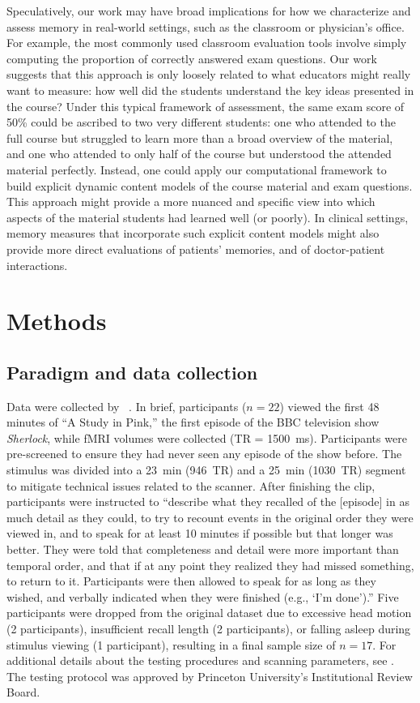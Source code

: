 \documentclass[10pt]{article}
\begin{document}
Speculatively, our work may have broad implications for how we characterize and assess memory in real-world settings, such as the classroom or physician's office.  For example, the most commonly used classroom evaluation tools involve simply computing the proportion of correctly answered exam questions.  Our work suggests that this approach is only loosely related to what educators might really want to measure: how well did the students understand the key ideas presented in the course?  Under this typical framework of assessment, the same exam score of 50\% could be ascribed to two very different students: one who attended to the full course but struggled to learn more than a broad overview of the material, and one who attended to only half of the course but understood the attended material perfectly.  Instead, one could apply our computational framework to build explicit dynamic content models of the course material and exam questions.  This approach might provide a more nuanced and specific view into which aspects of the material students had learned well (or poorly).  In clinical settings, memory measures that incorporate such explicit content models might also provide more direct evaluations of patients' memories, and of doctor-patient interactions.


\section*{Methods}
\label{sec:methods}

\subsection*{Paradigm and data collection}
Data were collected by \citeauthor{ChenEtal17}~\citep{ChenEtal17}.  In brief, participants ($n=22$) viewed the first 48 minutes of ``A Study in Pink,'' the first episode of the BBC television show \textit{Sherlock}, while fMRI volumes were collected (TR = 1500~ms).  Participants were pre-screened to ensure they had never seen any episode of the show before.  The stimulus was divided into a 23~min (946~TR) and a 25~min (1030~TR) segment to mitigate technical issues related to the scanner.  After finishing the clip, participants were instructed to \citep[quoting from][]{ChenEtal17} ``describe what they recalled of the [episode] in as much detail as they could, to try to recount events in the original order they were viewed in, and to speak for at least 10 minutes if possible but that longer was better. They were told that completeness and detail were more important than temporal order, and that if at any point they realized they had missed something, to return to it. Participants were then allowed to speak for as long as they wished, and verbally indicated when they were finished (e.g., `I’m done').''  Five participants were dropped from the original dataset due to excessive head motion (2 participants), insufficient recall length (2 participants), or falling asleep during stimulus viewing (1 participant), resulting in a final sample size of $n=17$.  For additional details about the testing procedures and scanning parameters, see \cite{ChenEtal17}.  The testing protocol was approved by Princeton University's Institutional Review Board.
\end{document}
